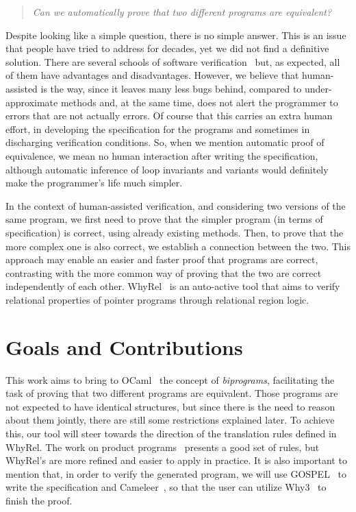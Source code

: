 \begin{quote}
    \centering
    \emph{Can we automatically prove that two different programs are equivalent?}
\end{quote}

Despite looking like a simple question, there is no simple answer.
This is an issue that people have tried to address for decades, yet we did not find a definitive solution.
There are several schools of software verification~\cite{DBLP:conf/fm/BrainP24} but, as expected, all of them have advantages and disadvantages.
However, we believe that human-assisted is the way, since it leaves many less bugs behind, compared to under-approximate methods and, at the same time, does not alert the programmer to errors that are not actually errors.
Of course that this carries an extra human effort, in developing the specification for the programs and sometimes in discharging verification conditions.
So, when we mention automatic proof of equivalence, we mean no human interaction after writing the specification, although automatic inference of loop invariants and variants would definitely make the programmer's life much simpler.

In the context of human-assisted verification, and considering two versions of the same program, we first need to prove that the simpler program (in terms of specification) is correct, using already existing methods.
Then, to prove that the more complex one is also correct, we establish a connection between the two.
This approach may enable an easier and faster proof that programs are correct, contrasting with the more common way of proving that the two are correct independently of each other. 
WhyRel~\cite{whyrel} is an auto-active tool that aims to verify relational properties of pointer programs through relational region logic.


\section{Goals and Contributions}

This work aims to bring to OCaml~\cite{ocaml} the concept of \emph{biprograms}, facilitating the task of proving that two different programs are equivalent.
Those programs are not expected to have identical structures, but since there is the need to reason about them jointly, there are still some restrictions explained later.
To achieve this, our tool will steer towards the direction of the translation rules defined in WhyRel.
The work on product programs~\cite{DBLP:conf/fm/BartheCK11} presents a good set of rules, but WhyRel's are more refined and easier to apply in practice.
It is also important to mention that, in order to verify the generated program, we will use GOSPEL~\cite{DBLP:conf/fm/ChargueraudFLP19} to write the specification and Cameleer~\cite{DBLP:conf/cav/PereiraR20}, so that the user can utilize Why3~\cite{why3} to finish the proof.

